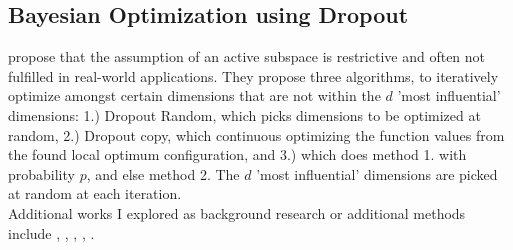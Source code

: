 \subsection{Bayesian Optimization using Dropout}

\citep{Li2018} propose that the assumption of an active subspace is restrictive and often not fulfilled in real-world applications.
They propose three algorithms, to iteratively optimize amongst certain dimensions that are not within the $d$ 'most influential' dimensions: 1.) Dropout Random, which picks dimensions to be optimized at random, 2.) Dropout copy, which continuous optimizing the function values from the found local optimum configuration, and 3.) which does method 1. with probability $p$, and else method 2.
The $d$ 'most influential' dimensions are picked at random at each iteration. \\

Additional works I explored as background research or additional methods include \citep{KernelGibbsSampler}, \citep{VirtualVsReal}, \citep{SensorPlacement}, \citep{BatchedBO}, \citep{GPforML}.
